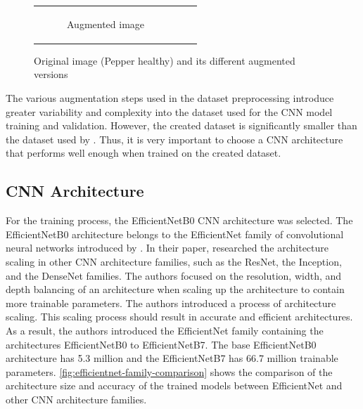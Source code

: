 \documentclass{BachelorBUI}
\begin{document}
\begin{figure}[!h]
\begin{tabular}{ccc}
\begin{subfigure}{0.30\textwidth}
                    \caption{\centering Augmented image}
                \end{subfigure} \\
            \end{tabular}
            \caption{\centering Original image (Pepper healthy) and its different augmented versions}
            \label{fig:augmentation-pipeline}
        \end{figure}

        The various augmentation steps used in the dataset preprocessing introduce greater variability and complexity into the dataset used for the CNN model training and validation. However, the created dataset is significantly smaller than the dataset used by \textcite{Mohanty:2016}. Thus, it is very important to choose a CNN architecture that performs well enough when trained on the created dataset.

    \subsection{CNN Architecture}

    For the training process, the EfficientNetB0 CNN architecture was selected. The EfficientNetB0 architecture belongs to the EfficientNet family of convolutional neural networks introduced by \textcite{Tan:2019}. In their paper, \textcite{Tan:2019} researched the architecture scaling in other CNN architecture families, such as the ResNet, the Inception, and the DenseNet families. The authors focused on the resolution, width, and depth balancing of an architecture when scaling up the architecture to contain more trainable parameters. The authors introduced a process of architecture scaling. This scaling process should result in accurate and efficient architectures. As a result, the authors introduced the EfficientNet family containing the architectures EfficientNetB0 to EfficientNetB7. The base EfficientNetB0 architecture has 5.3 million and the EfficientNetB7 has 66.7 million trainable parameters. \autoref{fig:efficientnet-family-comparison} shows the comparison of the architecture size and accuracy of the trained models between EfficientNet and other CNN architecture families.
\end{document}
